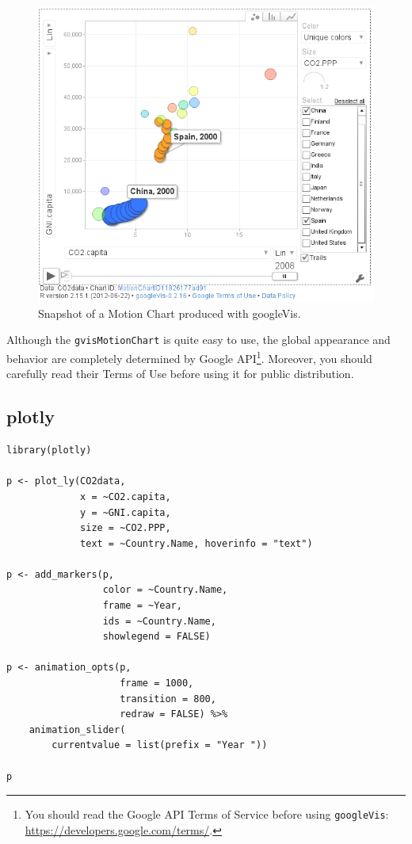\documentclass[smallroyalvopaper]{memoir}
\begin{document}
\begin{figure}
  \centering
  \includegraphics[width=\textwidth]{figs/googleVis}
  \caption{Snapshot of a Motion Chart produced with googleVis.}
  \label{fig:googleVis}
\end{figure}


Although the \texttt{gvisMotionChart} is quite easy to use, the global
appearance and behavior are completely determined by Google
API\footnote{You should read the Google API Terms of Service before using
\texttt{googleVis}: \url{https://developers.google.com/terms/}.}. Moreover, you should carefully read their Terms of Use
before using it for public distribution.


\subsection{plotly}
\label{sec:org5de0add}


\lstset{language=r,label= ,caption= ,captionpos=b,numbers=none}
\begin{lstlisting}
library(plotly)

p <- plot_ly(CO2data,
             x = ~CO2.capita,
             y = ~GNI.capita,
             size = ~CO2.PPP, 
             text = ~Country.Name, hoverinfo = "text")

p <- add_markers(p,
                 color = ~Country.Name,
                 frame = ~Year,
                 ids = ~Country.Name,
                 showlegend = FALSE)

p <- animation_opts(p,
                    frame = 1000,
                    transition = 800,
                    redraw = FALSE) %>%
    animation_slider(
        currentvalue = list(prefix = "Year "))

p
\end{lstlisting}
\end{document}
